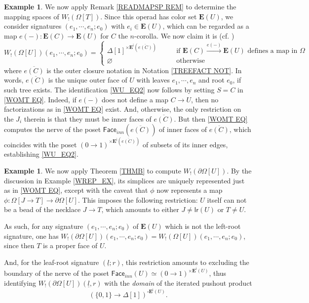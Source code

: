 \documentclass[a4paper,10pt]{article}%
\numberwithin{equation}{section}
\numberwithin{figure}{section}
\theoremstyle{definition} %
\newtheorem{example}[equation]{Example}%
\begin{document}
\begin{example}
We now apply Remark \ref{READMAPSP REM}
to determine the mapping spaces of $W_!(\Omega[T])$.
Since this operad has color set 
$\boldsymbol{E}(U)$,
we consider signatures 
$(e_1,\cdots,e_n;e_0)$ with 
$e_i \in \boldsymbol{E}(U)$,
which can be regarded as a map
$e(-) \colon \boldsymbol{E}(C) \to \boldsymbol{E}(U)$
for $C$ the $n$-corolla.
We now claim it is 
(cf. \cite[\S 4]{CM13b})
\begin{equation}\label{WU_EQ2}
	W_!(\Omega[U])(e_1,\cdots,e_n;e_0) =
	\begin{cases}
	\Delta[1]^{\times \boldsymbol{E}^{\mathsf{i}}(\overline{e(C)})}
	\qquad
&
	\mbox{if $\boldsymbol{E}(C) \xrightarrow{e(-)} \boldsymbol{E}(U)$ defines a map in $\Omega$}
\\
	\varnothing
&
	\mbox{otherwise}
\end{cases}
\end{equation}
where $\overline{e(C)}$ is the outer closure notation in 
Notation \ref{TREEFACT NOT}.
In words, $\overline{e(C)}$ is the unique outer face of $U$
with leaves $e_1,\cdots,e_n$ and root $e_0$,
if such tree exists.
The identification \eqref{WU_EQ2}
now follows by setting $S=C$ in \eqref{WOMT EQ}. 
Indeed, if $e(-)$ does not define a map $C \to U$,
then no factorizations as in \eqref{WOMT EQ} exist.
And, otherwise, the only restriction on the $J_i$ therein
is that they must be inner faces of $\overline{e(C)}$.
But then \eqref{WOMT EQ} computes the nerve of the poset
$\mathsf{Face}_{inn}(\overline{e(C)})$ of inner faces of $\overline{e(C)}$,
which coincides with the poset 
$(0 \to 1)^{\times \boldsymbol{E}^{\mathsf{i}}(\overline{e(C)})}$
of subsets of its inner edges,
establishing \eqref{WU_EQ2}.
\end{example}




\begin{example}\label{WPARTIALT_EX}
	We now apply Theorem \ref{THMB} to compute
	$W_!(\partial \Omega[U])$.
	By the discussion in Example \ref{WREP_EX},
	its simplices are uniquely represented just as in 
	\eqref{WOMT EQ},
	except with the caveat that $\phi$
	now represents a map
	$\phi \colon \Omega[J\to T] \to \partial \Omega[U]$.
	This imposes the following restriction: $U$ itself can not be a bead of the necklace $J\to T$,
	which amounts to either 
	$J\neq \mathsf{lr}(U)$ or $T\neq U$.
	
	As such, for any signature
	$(e_1,\cdots,e_n;e_0)$ of $\boldsymbol{E}(U)$
	which is not the left-root signature,
	one has
	$W_!(\partial \Omega[U])(e_1,\cdots,e_n;e_0) =
	W_!(\Omega[U])(e_1,\cdots,e_n;e_0)$,
	since then $T$ is a proper face of $U$.
	
	And, for the leaf-root signature $(\underline{l};r)$,
	this restriction amounts to excluding the boundary
	of the nerve of the poset 
	$\mathsf{Face}_{inn}(U)
	\simeq 
	(0 \to 1)^{\times \boldsymbol{E}^{\mathsf{i}}(U)}$,
	thus identifying 	$W_!(\partial \Omega[U])(\underline{l},r)$ 
	with the \emph{domain} of the iterated pushout product
	\[
	\left(
	\{0,1\} \to \Delta[1]
	\right)^{\square \boldsymbol{E}^{\mathsf{i}}(U)}.
	\]
\end{example}
\end{document}
